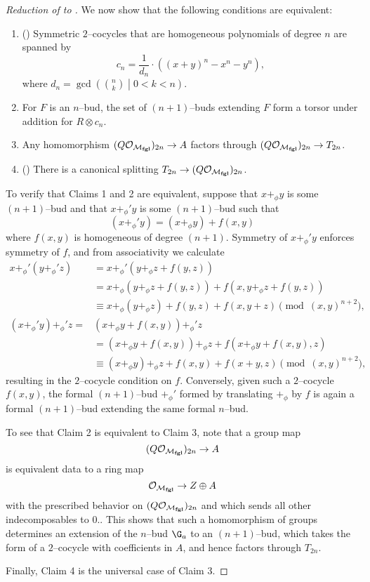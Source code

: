 \begin{proof}[{Reduction of  to }]
We now show that the following conditions are equivalent:
\begin{enumerate}
\item () Symmetric $2$--cocycles that are homogeneous polynomials of degree $n$ are spanned by \[c_n = \frac{1}{d_n} \cdot ((x + y)^n - x^n - y^n),\] where $d_n = \gcd\left( \binom{n}{k} \middle| 0 < k < n \right)$.
\item For $F$ is an $n$--bud, the set of $(n+1)$--buds extending $F$ form a torsor under addition for $R \otimes c_n$.
\item Any homomorphism $(Q\mathcal O_{\mathcal{M}_{\mathbf{fgl}}})_{2n} \to A$ factors through $(Q \mathcal O_{\mathcal{M}_{\mathbf{fgl}}})_{2n} \to T_{2n}$.
\item () There is a canonical splitting $T_{2n} \to (Q \mathcal O_{\mathcal{M}_{\mathbf{fgl}}})_{2n}$.
\end{enumerate}

To verify that Claims 1 and 2 are equivalent, suppose that $x +_\phi y$ is some $(n+1)$--bud and that $x +_\phi' y$ is some $(n+1)$--bud such that \[(x +_\phi' y) = (x +_\phi y) + f(x, y)\] where $f(x, y)$ is homogeneous of degree $(n+1)$.  Symmetry of $x +_\phi' y$ enforces symmetry of $f$, and from associativity we calculate
\begin{align*}
x +_\phi' (y +_\phi' z) & = x +_\phi' (y +_\phi z + f(y, z)) \\
& = x +_\phi (y +_\phi z + f(y, z)) + f(x, y +_\phi z + f(y, z)) \\
& \equiv x +_\phi (y +_\phi z) + f(y, z) + f(x, y + z) \pmod{(x, y)^{n+2}}, \\
(x +_\phi' y) +_\phi' z = & (x +_\phi y + f(x, y)) +_\phi' z \\
& = (x +_\phi y + f(x, y)) +_\phi z + f(x +_\phi y + f(x, y), z) \\
& \equiv (x +_\phi y) +_\phi z + f(x, y) + f(x + y, z) \pmod{(x, y)^{n+2}},
\end{align*}
resulting in the $2$--cocycle condition on $f$.  Conversely, given such a $2$--cocycle $f(x, y)$, the formal $(n+1)$--bud $+_\phi'$ formed by translating $+_\phi$ by $f$ is again a formal $(n+1)$--bud extending the same formal $n$--bud.

To see that Claim 2 is equivalent to Claim 3, note that a group map \[(Q\mathcal O_{\mathcal{M}_{\mathbf{fgl}}})_{2n} \to A\] is equivalent data to a ring map \[\mathcal O_{\mathcal{M}_{\mathbf{fgl}}} \to Z \oplus A\] with the prescribed behavior on $(Q\mathcal O_{\mathcal{M}_{\mathbf{fgl}}})_{2n}$ and which sends all other indecomposables to $0$..  This shows that such a homomorphism of groups determines an extension of the $n$--bud $\G_a$ to an $(n+1)$--bud, which takes the form of a $2$--cocycle with coefficients in $A$, and hence factors through $T_{2n}$.

Finally, Claim 4 is the universal case of Claim 3.
\end{proof}


